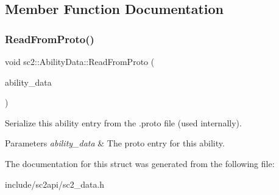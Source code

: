 \subsection{Member Function Documentation}
\mbox{\label{structsc2_1_1_ability_data_a974e180b290ad684b2806232ccb55b5c}} 
\subsubsection{\texorpdfstring{Read\+From\+Proto()}{ReadFromProto()}}
{\footnotesize\ttfamily void sc2\+::\+Ability\+Data\+::\+Read\+From\+Proto (\begin{DoxyParamCaption}\item[{const S\+C2\+A\+P\+I\+Protocol\+::\+Ability\+Data \&}]{ability\+\_\+data }\end{DoxyParamCaption})}

Serialize this ability entry from the .proto file (used internally). 
\begin{DoxyParams}{Parameters}
{\em ability\+\_\+data} & The proto entry for this ability. \\
\hline
\end{DoxyParams}


The documentation for this struct was generated from the following file\+:\begin{DoxyCompactItemize}
\item 
include/sc2api/sc2\+\_\+data.\+h\end{DoxyCompactItemize}
